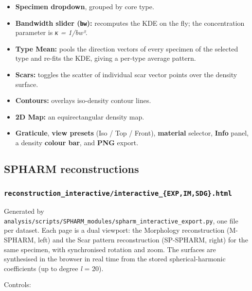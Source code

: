 \documentclass[
  letterpaper,
  DIV=11,
  numbers=noendperiod]{scrartcl}
\providecommand{\tightlist}{%
  \setlength{\itemsep}{0pt}\setlength{\parskip}{0pt}}
\begin{document}
\begin{itemize}
\tightlist
\item
  \textbf{Specimen dropdown}, grouped by core type.
\item
  \textbf{Bandwidth slider (\texttt{bw}):} recomputes the KDE on the
  fly; the concentration parameter is \emph{κ = 1/bw²}.
\item
  \textbf{Type Mean:} pools the direction vectors of every specimen of
  the selected type and re-fits the KDE, giving a per-type average
  pattern.
\item
  \textbf{Scars:} toggles the scatter of individual scar vector points
  over the density surface.
\item
  \textbf{Contours:} overlays iso-density contour lines.
\item
  \textbf{2D Map:} an equirectangular density map.
\item
  \textbf{Graticule}, \textbf{view presets} (Iso / Top / Front),
  \textbf{material} selector, \textbf{Info} panel, a density
  \textbf{colour bar}, and \textbf{PNG} export.
\end{itemize}

\subsection{SPHARM reconstructions}\label{spharm-reconstructions}

\subsubsection{\texorpdfstring{\texttt{reconstruction\_interactive/interactive\_\{EXP,IM,SDG\}.html}}{reconstruction\_interactive/interactive\_\{EXP,IM,SDG\}.html}}\label{reconstruction_interactiveinteractive_expimsdg.html}

Generated by
\texttt{analysis/scripts/SPHARM\_modules/spharm\_interactive\_export.py},
one file per dataset. Each page is a dual viewport: the Morphology
reconstruction (M-SPHARM, left) and the Scar pattern reconstruction
(SP-SPHARM, right) for the same specimen, with synchronised rotation and
zoom. The surfaces are synthesised in the browser in real time from the
stored spherical-harmonic coefficients (up to degree \emph{l} = 20).

Controls:
\end{document}
